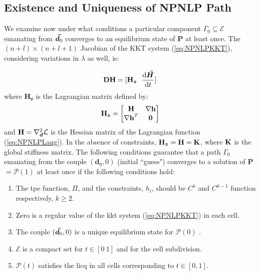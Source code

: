 \subsection{Existence and Uniqueness of NPNLP Path}\label{CH4-S2SS1}

We examine now under what conditions a particular component
$\mathit{\Gamma_0}\subseteq{\mathcal{E}}$ emanating from $\vec{\bm{d}}_0$ converges 
to an
equilibrium state of \textbf{P} at least once. The $(n+l)\times(n+l+1)$ 
Jacobian of the KKT system
(\ref{eq:NPNLPKKT}), considering variations in $\lambda$ as well, is:

\begin{equation}
	\bmat{DH} = [\bmat{H}_{\bm{z}}\ \ \frac{\text{d}\bvec{H}}{\text{d}t}]
	\label{eq:NPNLP-J}
\end{equation}
\noindent where $\bm{H}_{\bm{z}}$ is the Lagrangian matrix defined
by:
\begin{equation}
	\mathbf{H}_{\bm{z}} = \begin{bmatrix}
		\mathbf{H} & \mathbf{\nabla h}\\
		\mathbf{\nabla h}^T & \mathbf{0}
	\end{bmatrix}
	\label{eq:LagrangianMatrix}
\end{equation}
and $\mathbf{H}= \nabla_{\bm{d}}^2\mathcal{L}$ is the Hessian matrix of the 
Lagrangian function
(\ref{eq:NPNLPLang}). In the absence of constraints, 
$\mathbf{H}_{\bm{z}}=\mathbf{H}=\mathbf{K}$,
where $\mathbf{K}$ is the global stiffness matrix. The following conditions
guarantee that a path $\mathit{\Gamma_0}$ emanating 
from the couple $(\bm{d}_0,0)$ (initial ``guess") converges
to a solution of \textbf{P} $=\bm{\mathcal{P}}(1)$ at least once if the 
following
conditions hold\cite{Gfrerer:1985}:
\begin{enumerate}
	\item The \acrshort{tpe} function, $\Pi$, and the constraints, $h_i$, 
	should be $C^k$
	and $C^{k-1}$ function respectively, $k\geq 2$.
	\item Zero is a regular value of the \acrshort{kkt} system 
	(\ref{eq:NPNLPKKT}) in each
	cell.
	\item The couple $(\vec{\bm{d}}_0,0)$ is a unique equilibrium state for
	$\bm{\mathcal{P}}(0)$ .
	\item $\mathcal{E}$ is a compact set for $t\in[0\ 1]$ and for the cell
	subdivision.
	\item $\bm{\mathcal{P}}(t)$ satisfies the \acrshort{licq} in all 
	cells corresponding to $t\in[0,1]$.
\end{enumerate}

